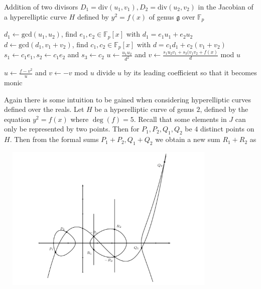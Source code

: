 \begin{algorithm} \label{hyperellipticlaw}
	\caption{Addition of two divisors $D_1 =\text{div}(u_1,v_1), D_2 = \text{div} (u_2,v_2) $ in the Jacobian of a hyperelliptic curve $H$ defined by $y^2 = f(x)$ of genus $\mathfrak{g}$ over $\mathbb{F}_p$}
	\begin{algorithmic}[1]
			\State $d_1 \leftarrow \text{gcd}(u_1,u_2)$, find $e_1,e_2 \in \mathbb{F}_p[x]$ with $d_1 = e_1u_1 + e_2u_2$ 
			\State $d \leftarrow \text{gcd}(d_1,v_1 + v_2)$, find $c_1, c_2 \in \mathbb{F}_p[x]$ with $d = c_1d_1 + c_2(v_1 + v_2)$ 
			\State $s_1 \leftarrow c_1e_1, s_2 \leftarrow c_1e_2$ and $s_3 \leftarrow c_2$
			\State $u \leftarrow \frac{u_1u_2}{d^2}$ and $v \leftarrow \frac{s_1u_2v_1 + s_3(v_1v_2 + f(x)}{d}$ mod $u$
			
				\State $u \leftarrow \frac{f - v^2}{u}$ and $v \leftarrow -v$ mod $u$
			\EndWhile
			\State divide $u $ by its leading coefficient so that it becomes monic
			\State {}
		\EndFunction
	\end{algorithmic} 
\end{algorithm} 

Again there is some intuition to be gained when considering hyperelliptic curves defined over the reals. Let $H$ be a hyperelliptic curve of genus $2$, defined by the equation $y^2 = f(x)$ where $\deg(f) = 5$. Recall that some elements in $J$ can only be represented by two points. Then for $P_1,P_2,Q_1,Q_2$ be $4$ distinct points on $H$. Then from the formal sums $P_1 + P_2, Q_1 + Q_2$ we obtain a new sum $R_1 + R_2$ as 

\begin{center}
	\includegraphics[width=11cm, height=7cm]{helliptic}
\end{center}

